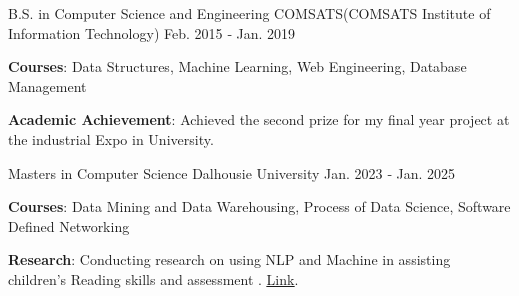 

\begin{cventries}

  \cventry
    {B.S. in Computer Science and Engineering} %
    {COMSATS(COMSATS Institute of Information Technology)} %
    {} %
    {Feb. 2015 ‑ Jan. 2019} %
    {
      \begin{cvitems} %
        \item {\textbf{Courses}: Data Structures, Machine Learning, Web Engineering, Database Management}
        \item {\textbf{Academic Achievement}: Achieved the second prize for my final year project at the industrial Expo in University.}
      \end{cvitems}
    }

\end{cventries}


\begin{cventries}

  \cventry
    {Masters in Computer Science} %
    {Dalhousie University} %
    {} %
    {Jan. 2023 ‑ Jan. 2025} %
    {
      \begin{cvitems} %
        \item {\textbf{Courses}: Data Mining and Data Warehousing, Process of Data Science, Software Defined Networking}
        \item { \textbf{Research}: Conducting research on using NLP and Machine in assisting children's Reading skills and assessment . \href{https://yahyakiani.github.io/blog.yahyakiani.dev/docs/thesis/}{\color{awesome-orange}\uline{Link}}.
        }
      \end{cvitems}
    }

\end{cventries}
